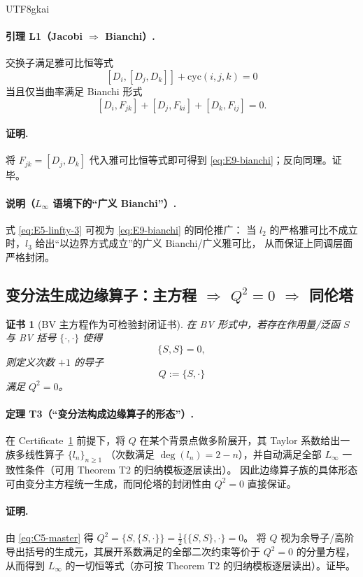 \documentclass[12pt]{article}
\newtheorem{Certificate}{证书}[section]
\begin{document}
\begin{CJK*}{UTF8}{gkai}
\paragraph{引理 L1（Jacobi $\Rightarrow$ Bianchi）.}
交换子满足雅可比恒等式
\[
[D_i,[D_j,D_k]]+\text{cyc}(i,j,k)=0
\]
当且仅当曲率满足 Bianchi 形式
\[
[D_i,F_{jk}] + [D_j,F_{ki}] + [D_k,F_{ij}] = 0.
\tag{E9}
\label{eq:E9-bianchi}
\]

\paragraph{证明.}
将 $F_{jk}=[D_j,D_k]$ 代入雅可比恒等式即可得到 \eqref{eq:E9-bianchi}；反向同理。证毕。

\paragraph{说明（$L_\infty$ 语境下的“广义 Bianchi”）.}
式 \eqref{eq:E5-linfty-3} 可视为 \eqref{eq:E9-bianchi} 的同伦推广：
当 $l_2$ 的严格雅可比不成立时，$l_3$ 给出“以边界方式成立”的广义 Bianchi/广义雅可比，
从而保证上同调层面严格封闭。

\subsection{变分法生成边缘算子：主方程 $\Rightarrow$ $Q^2=0$ $\Rightarrow$ 同伦塔}
\label{subsec:edge-op-variational}

\begin{Certificate}[BV 主方程作为可检验封闭证书]
\label{cert:edge-bv-master}
在 BV 形式中，若存在作用量/泛函 $S$ 与 BV 括号 $\{\cdot,\cdot\}$ 使得
\[
\{S,S\}=0,
\tag{C5}
\label{eq:C5-master}
\]
则定义次数 $+1$ 的导子
\[
Q:=\{S,\cdot\}
\]
满足 $Q^2=0$。
\end{Certificate}

\paragraph{定理 T3（“变分法构成边缘算子的形态”）.}
在 Certificate~\ref{cert:edge-bv-master} 前提下，将 $Q$ 在某个背景点做多阶展开，其 Taylor 系数给出一族多线性算子 $\{l_n\}_{n\ge 1}$
（次数满足 $\deg(l_n)=2-n$），并自动满足全部 $L_\infty$ 一致性条件（可用 Theorem T2 的归纳模板逐层读出）。
因此边缘算子族的具体形态可由变分主方程统一生成，而同伦塔的封闭性由 $Q^2=0$ 直接保证。

\paragraph{证明.}
由 \eqref{eq:C5-master} 得 $Q^2=\{S,\{S,\cdot\}\}=\tfrac12\{\{S,S\},\cdot\}=0$。
将 $Q$ 视为余导子/高阶导出括号的生成元，其展开系数满足的全部二次约束等价于 $Q^2=0$ 的分量方程，
从而得到 $L_\infty$ 的一切恒等式（亦可按 Theorem T2 的归纳模板逐层读出）。证毕。


\end{CJK*}
\end{document}
